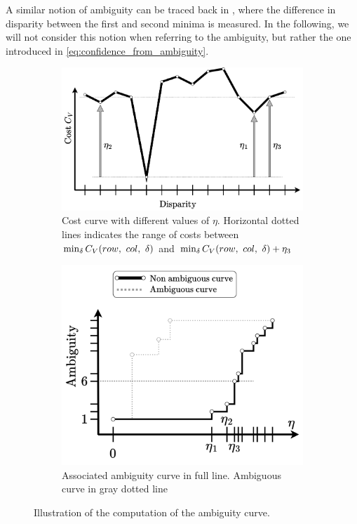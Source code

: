 \begin{remark}
     A similar notion of ambiguity can be traced back in \cite{de_joinville_evaluation_2001}, where the difference in disparity between the first and second minima is measured. In the following, we will not consider this notion when referring to the ambiguity, but rather the one introduced in \cref{eq:confidence_from_ambiguity}.
\end{remark}

\begin{figure}
    \centering
    \begin{subfigure}[t]{0.6\linewidth}
        \centering
        \includegraphics[width=\linewidth]{Images/Chap_1/Integral_Ambiguity_1.png}
        \caption{Cost curve with different values of $\eta$. Horizontal dotted lines indicates the range of costs between $\min_\delta C_V(row, ~col, ~\delta)$ and $\min_\delta C_V(row, ~col, ~\delta)+\eta_3$}
        \label{fig:integral_ambiguity_1}
    \end{subfigure}\hfill
    \begin{subfigure}[t]{0.4\linewidth}
        \centering
        \includegraphics[width=\linewidth]{Images/Chap_1/Integral_Ambiguity_2.png}
        \caption{Associated ambiguity curve in full line. Ambiguous curve in gray dotted line}
        \label{fig:integral_ambiguity_2}
    \end{subfigure}\hfill
    \caption{Illustration of the computation of the ambiguity curve.}
    \label{fig:integral_ambiguity}
\end{figure}

